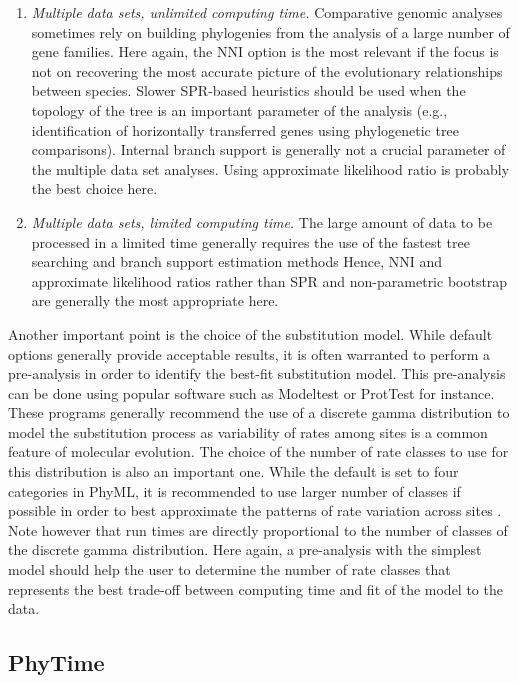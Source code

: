 \documentclass[a4paper,12pt]{article}
\begin{document}
\begin{enumerate}
\item {\em  Multiple data  sets, unlimited computing  time.} Comparative genomic  analyses sometimes
rely on building phylogenies from the analysis of  a large number of gene families.  Here again, the
NNI option is the most  relevant if the focus is not on recovering the  most accurate picture of the
evolutionary relationships  between species.   Slower SPR-based heuristics  should be used  when the
topology of the tree is an important parameter of the analysis (e.g., identification of horizontally
transferred genes using phylogenetic tree comparisons).   Internal branch support is generally not a
crucial parameter of the multiple data  set analyses. Using approximate likelihood ratio is probably
the best choice here.

\item {\em Multiple data sets, limited computing time.}  The large amount of data to be processed in
a  limited time  generally  requires  the use  of  the fastest  tree  searching  and branch  support
estimation methods Hence,  NNI and approximate likelihood ratios rather  than SPR and non-parametric
bootstrap are generally the most appropriate here.
\end{enumerate}

Another important  point is the  choice of the  substitution model. While default  options generally
provide acceptable results, it is often warranted to perform a pre-analysis in order to identify the
best-fit substitution model.  This pre-analysis can be done using popular software such as Modeltest
\cite{posada98} or ProtTest  \cite{abascal05} for instance.  These programs  generally recommend the
use of a discrete gamma distribution to model the substitution process as variability of rates among
sites is a common  feature of molecular evolution.  The choice of the number  of rate classes to use
for this  distribution is  also an important  one. While the  default is  set to four  categories in
PhyML, it is  recommended to use larger number  of classes if possible in order  to best approximate
the  patterns of rate  variation across  sites \cite{galtier04}.   Note however  that run  times are
directly proportional to  the number of classes  of the discrete gamma distribution.   Here again, a
pre-analysis with the  simplest model should help the  user to determine the number  of rate classes
that represents the best trade-off between computing time and fit of the model to the data.


\subsection{PhyTime}\label{sec:recomphytime}
\end{document}
